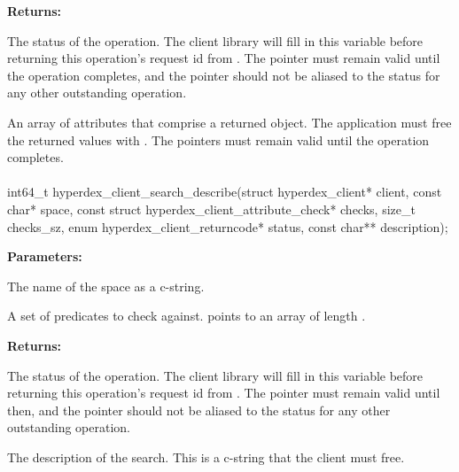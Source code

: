 \noindent\textbf{Returns:}
\begin{description}[labelindent=\widthof{{\code{attrs}, \code{attrs\_sz}}},leftmargin=*,noitemsep,nolistsep,align=right]
\item[\code{status}] The status of the operation.  The client library will fill in this variable before returning this operation's request id from .  The pointer must remain valid until the operation completes, and the pointer should not be aliased to the status for any other outstanding operation.
\item[\code{attrs}, \code{attrs\_sz}] An array of attributes that comprise a returned object.  The application must free the returned values with .  The pointers must remain valid until the operation completes.
\end{description}

\paragraph{}
\label{api:c:search_describe}
\begin{ccode}
int64_t hyperdex_client_search_describe(struct hyperdex_client* client,
                const char* space,
                const struct hyperdex_client_attribute_check* checks, size_t checks_sz,
                enum hyperdex_client_returncode* status,
                const char** description);
\end{ccode}
\funcdesc 

\noindent\textbf{Parameters:}
\begin{description}[labelindent=\widthof{{\code{checks}, \code{checks\_sz}}},leftmargin=*,noitemsep,nolistsep,align=right]
\item[\code{space}] The name of the space as a c-string.
\item[\code{checks}, \code{checks\_sz}] A set of predicates to check against.   points to an array of length .
\end{description}

\noindent\textbf{Returns:}
\begin{description}[labelindent=\widthof{{\code{description}}},leftmargin=*,noitemsep,nolistsep,align=right]
\item[\code{status}] The status of the operation.  The client library will fill in this variable before returning this operation's request id from .  The pointer must remain valid until then, and the pointer should not be aliased to the status for any other outstanding operation.
\item[\code{description}] The description of the search.  This is a c-string that the client must free.
\end{description}


